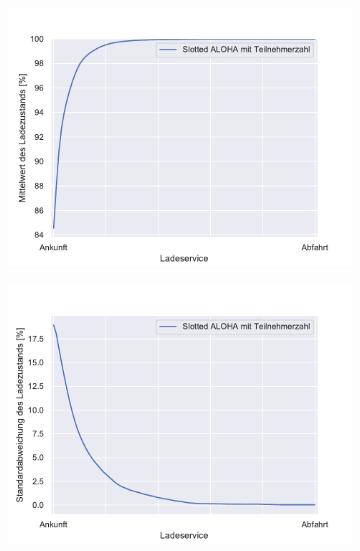 \begin{figure}
	\begin{subfigure}{0.49\linewidth}
		\includegraphics[width=\linewidth]{img/SA_par/SlottedAloha_participants_VDE_tau_10_soc_mean.pdf}
        \label{ABB_SAparSocMEAN}
	\end{subfigure}
	\begin{subfigure}{0.49\linewidth}
		\includegraphics[width=\linewidth]{img/SA_par/SlottedAloha_participants_VDE_tau_10_soc_std.pdf}
        \label{ABB_SAparSocSTD}
	\end{subfigure}
\end{figure}
